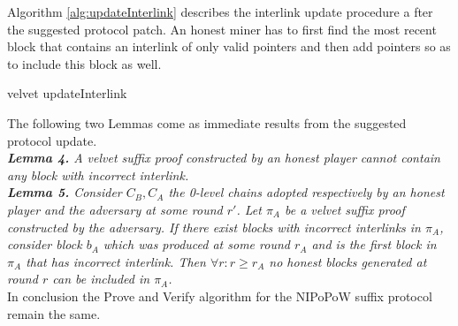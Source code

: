 Algorithm \ref{alg:updateInterlink} describes the interlink update procedure a
fter the suggested protocol patch. An honest miner has to first find the most
recent block that contains an interlink of only valid pointers and then add
pointers so as to include this block as well.
\vspace{4mm}

\begin{algorithm}[H]
		\SetAlgoNoLine
		\DontPrintSemicolon
	\vspace{4mm}

	\vspace{4mm}
 	\caption{velvet updateInterlink}
 	\label{alg:updateInterlink}
\end{algorithm}

\vspace{4mm}

The following two Lemmas come as immediate results from the suggested protocol update.\\

\textit{\textbf{Lemma 4.} A velvet suffix proof constructed by an honest player
cannot contain any block with incorrect interlink.}\\

\textit{\textbf{Lemma 5.} Consider $C_B, C_A$ the 0-level chains adopted respectively
by an honest player and the adversary at some round $r'$. Let $\pi_A$ be a velvet
suffix proof constructed by the adversary. If there exist blocks with incorrect
interlinks in $\pi_A$, consider block $b_A$ which was produced at some round
$r_A$ and is the first block in $\pi_A$ that has incorrect interlink. Then
$\forall r: r \geq r_A$ no honest blocks generated at round $r$ can be included in $\pi_A$.} \\

In conclusion the Prove and Verify algorithm for the NIPoPoW suffix protocol remain the same.
